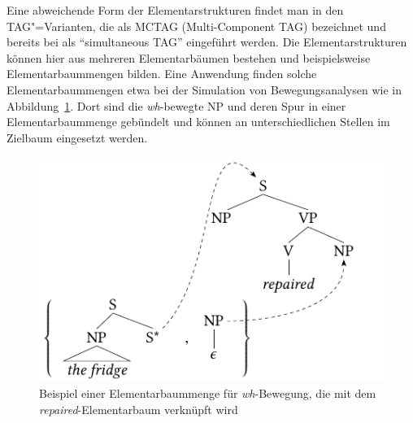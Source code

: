 Eine abweichende Form der Elementarstrukturen findet man in den TAG"=Varianten, die als \textsc{MCTAG} (Multi-Component TAG) bezeichnet und bereits bei \cite{Joshi:etal:75} als "`simultaneous TAG"' eingeführt werden. Die Elementarstrukturen können hier aus mehreren Elementarbäumen bestehen und beispielsweise Elementarbaummengen bilden. Eine Anwendung finden solche Elementarbaummengen  etwa bei der Simulation von Bewegungsanalysen wie in Abbildung~\ref{fig-mctag-bsp}. Dort sind die \textit{wh}-bewegte NP und deren Spur in einer Elementarbaummenge gebündelt und können an unterschiedlichen Stellen im Zielbaum eingesetzt werden.  
\begin{figure}[t]
\centering
\includegraphics{graphics/abb55.pdf}
\caption{\label{fig-mctag-bsp}Beispiel einer Elementarbaummenge für \textit{wh}-Bewegung, die mit dem {\it repaired}-Elementarbaum verknüpft wird}
\end{figure}
